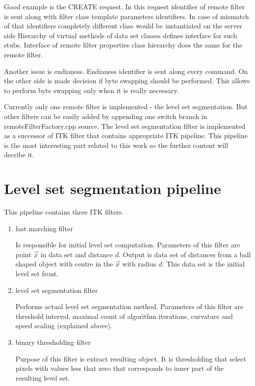 \par
Good example is the CREATE request.
In this request identifier of remote filter is sent along with filter class template parameters identifiers.
In case of mismatch of that identifiers completely different class would be instantiated on the server side
Hierarchy of virtual methods of data set classes defines interface for such stubs.
Interface of remote filter properties class hierarchy does the same for the remote filter.

\par
Another issue is endianess.
Endianess identifier is sent along every command.
On the other side is made decision if byte swapping should be performed.
This allows to perform byte swapping only when it is really necessary.

\par
Currently only one remote filter is implemented - the level set segmentation.
But other filters can be easily added by appending one switch branch in \mbox{remoteFilterFactory.cpp} source.
The level set segmentation filter is implemented as a successor of ITK filter that contains appropriate ITK pipeline.
This pipeline is the most interesting part related to this work so the further content will decribe it.

\section{Level set segmentation pipeline}

This pipeline contains three ITK filters.
\begin{enumerate}
  \item{fast marching filter}
  \par
  Is responsible for initial level set computation.
Parameters of this filter are point $\vec{x}$ in data set and distance $d$.
Output is data set of distances from a ball shaped object with centre in the $\vec{x}$ with radius $d$.
This data set is the initial level set front.

  \item{level set segmentation filter}
  \par
  Performs actual level set segmentation method.
Parameters of this filter are threshold interval, maximal count of algorithm iterations, curvature and speed scaling (explained above).

  \item{binary thresholding filter}
  \par
  Purpose of this filter is extract resulting object.
  It is thresholding that select pixels with values less that zero that corresponds to inner part of the resulting level set.
\end{enumerate}


